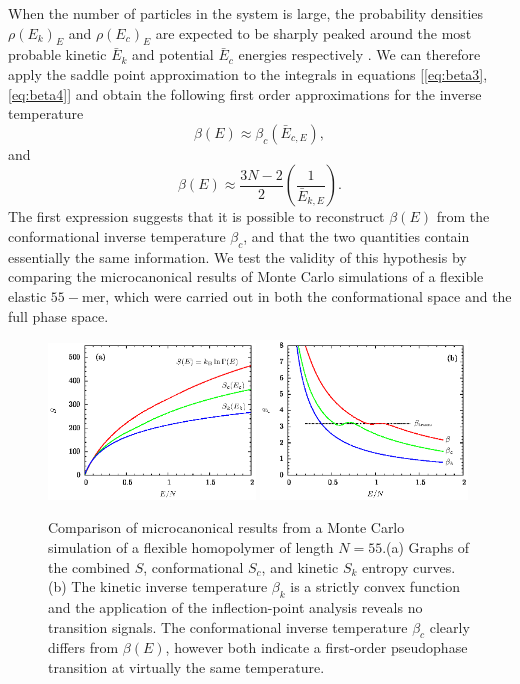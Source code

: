 \documentclass[12pt]{report}
\begin{document}
When the number of particles in the system is large, the probability densities $\rho(E_{k})_{E}$ and $\rho(E_{c})_{E}$ are expected to be sharply peaked around the most probable kinetic $\bar{E}_{k}$ and potential $\bar{E}_{c}$ energies respectively . We can therefore apply the saddle point approximation to the integrals in equations [\ref{eq:beta3}, \ref{eq:beta4}] and obtain the following first order approximations for the inverse temperature
\begin{equation}
\label{eq:approx1}
\beta(E) \approx \beta_{c}(\bar{E}_{c,E}),
\end{equation}
and
\begin{equation}
\label{eq:approx2}
\beta(E) \approx \frac{3N-2}{2}\left(\frac{1}{\bar{E}_{k,E}}\right). 
\end{equation}
The first expression suggests that it is possible to reconstruct $\beta(E)$ from the conformational inverse temperature $\beta_{c}$, and that the two quantities contain essentially the same information. We test the validity of this hypothesis by comparing the microcanonical results of Monte Carlo simulations of a flexible elastic $55-$mer, which were carried out in both the conformational space and the full phase space.
\newpage
\begin{figure}
\center
\includegraphics[width = 0.49\textwidth]{chapter2Figs/N55Entropy.eps}
\includegraphics[width = 0.49\textwidth]{chapter2Figs/N55Beta.eps}
\caption{\label{fig:Fig_7}%
Comparison of microcanonical results from a Monte Carlo simulation of a flexible homopolymer of length $N=55$.(a) Graphs of the combined $S$, conformational $S_{c}$, and kinetic $S_{k}$ entropy curves. (b) The kinetic inverse temperature $\beta_{k}$ is a strictly convex function and the application of the inflection-point analysis reveals no transition signals. The conformational inverse temperature $\beta_{c}$ clearly differs from $\beta(E)$, however both indicate a first-order pseudophase transition at virtually the same temperature. }
\end{figure}
\end{document}
